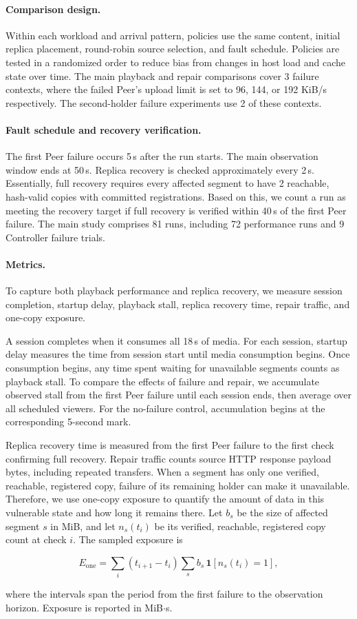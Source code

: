 \paragraph{Comparison design.}
Within each workload and arrival pattern, 
policies use the same content, initial replica placement, round-robin source selection, and fault schedule.
Policies are tested in a randomized order to reduce bias from changes in host load and cache state over time.
The main playback and repair comparisons cover 3 failure contexts, 
where the failed Peer's upload limit is set to 96, 144, or 192 KiB/s respectively.
The second-holder failure experiments use 2 of these contexts.

\paragraph{Fault schedule and recovery verification.}
The first Peer failure occurs 5\,s after the run starts.
The main observation window ends at 50\,s.
Replica recovery is checked approximately every 2\,s.
Essentially, full recovery requires every affected segment to have 2 reachable,
hash-valid copies with committed registrations.
Based on this, we count a run as meeting the recovery target if full recovery is verified within 40\,s of the first Peer failure.
The main study comprises 81 runs, including 72 performance runs and 9 Controller failure trials.

\paragraph{Metrics.}
To capture both playback performance and replica recovery, 
we measure session completion, startup delay, playback stall, replica recovery time, repair traffic, and one-copy exposure.

A session completes when it consumes all 18\,s of media.
For each session, startup delay measures the time from session start until media consumption begins. 
Once consumption begins, any time spent waiting for unavailable segments counts as playback stall.
To compare the effects of failure and repair, 
we accumulate observed stall from the first Peer failure until each session ends, 
then average over all scheduled viewers. 
For the no-failure control, accumulation begins at the corresponding 5-second mark.

Replica recovery time is measured from the first Peer failure
to the first check confirming full recovery.
Repair traffic counts source HTTP response payload bytes,
including repeated transfers.
When a segment has only one verified, reachable, registered copy,
failure of its remaining holder can make it unavailable.
Therefore, we use one-copy exposure to quantify the amount of data in this vulnerable
state and how long it remains there.
Let $b_s$ be the size of affected segment $s$ in MiB,
and let $n_s(t_i)$ be its verified, reachable, registered copy count
at check $i$.
The sampled exposure is

\begin{equation}
  E_{\mathrm{one}}
  = \sum_i (t_{i+1}-t_i)
    \sum_s b_s\,\mathbf{1}[n_s(t_i)=1],
\end{equation}

where the intervals span the period from the first failure
to the observation horizon.
Exposure is reported in MiB$\cdot$s.

